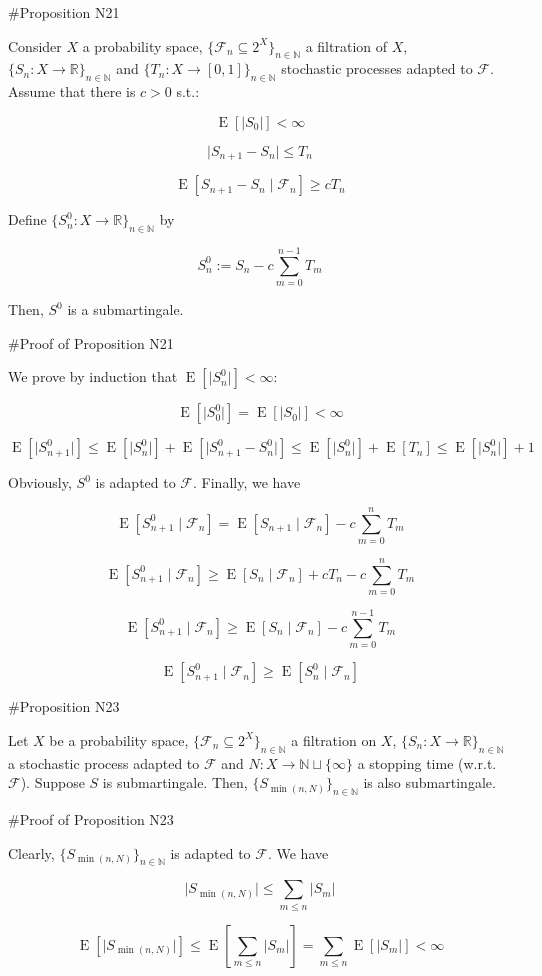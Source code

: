 \documentclass[a4paper]{article}
\DeclareMathOperator{\E}{E}
\newcommand{\Nats}{\mathbb{N}}
\newcommand{\Reals}{\mathbb{R}}
\newcommand{\Sq}[2]{\{#1\}_{#2 \in \Nats}}
\newcommand{\Sqn}[1]{\Sq{#1}{n}}
\newcommand{\Abs}[1]{\lvert #1 \rvert}
\newcommand{\F}{\mathcal{F}}
\begin{document}
\#Proposition N21

Consider ${X}$ a probability space, ${\{\F_n \subseteq 2^X\}_{n \in \Nats}}$ a filtration of ${X}$, ${\{S_n:X \rightarrow \Reals\}_{n \in \Nats}}$ and ${\{T_n:X \rightarrow [0,1]\}_{n \in \Nats}}$ stochastic processes adapted to ${\F}$. Assume that there is ${c > 0}$ s.t.:

$$\E[\Abs{S_0}] < \infty$$

$$\Abs{S_{n+1}-S_n} \leq T_n$$

$$\E[S_{n+1} - S_n \mid \F_n] \geq c T_n$$

Define ${\Sqn{S^0_n: X \rightarrow \Reals}}$ by

$$S^0_n := S_n - c \sum_{m=0}^{n-1} T_m$$
 
Then, ${S^0}$ is a submartingale.

\#Proof of Proposition N21

We prove by induction that ${\E[\Abs{S^0_n}] < \infty}$:

$${\E[\Abs{S^0_0}] = \E[\Abs{S_0}] < \infty}$$

$$\E[\Abs{S^0_{n+1}}] \leq \E[\Abs{S^0_n}] + \E[\Abs{S^0_{n+1}-S^0_n}] \leq \E[\Abs{S^0_n}] + \E[T_n] \leq \E[\Abs{S^0_n}] + 1$$

Obviously, ${S^0}$ is adapted to ${\F}$. Finally, we have

$$\E[S^0_{n+1} \mid \F_n] = \E[S_{n+1} \mid \F_n] - c \sum_{m = 0}^{n} T_m$$

$$\E[S^0_{n+1} \mid \F_n] \geq \E[S_{n} \mid \F_n] + c T_n - c \sum_{m = 0}^{n} T_m$$

$$\E[S^0_{n+1} \mid \F_n] \geq \E[S_{n} \mid \F_n] - c \sum_{m = 0}^{n - 1} T_m$$

$$\E[S^0_{n+1} \mid \F_n] \geq \E[S^0_{n} \mid \F_n]$$

\#Proposition N23

Let ${X}$ be a probability space, ${\Sqn{\F_n \subseteq 2^X}}$ a filtration on ${X}$, ${\Sqn{S_n: X \rightarrow \Reals}}$ a stochastic process adapted to ${\F}$ and ${N: X \rightarrow \Nats \sqcup \{\infty\}}$ a stopping time (w.r.t. ${\F}$). Suppose ${S}$ is submartingale. Then, ${\Sqn{S_{\min(n,N)}}}$ is also submartingale.

\#Proof of Proposition N23

Clearly, ${\Sqn{S_{\min(n,N)}}}$ is adapted to ${\F}$. We have

$$\Abs{S_{\min(n,N)}} \leq \sum_{m \leq n} \Abs{S_m}$$

$$\E[\Abs{S_{\min(n,N)}}] \leq \E[\sum_{m \leq n} \Abs{S_m}] = \sum_{m \leq n} \E[\Abs{S_m}] < \infty$$
\end{document}
